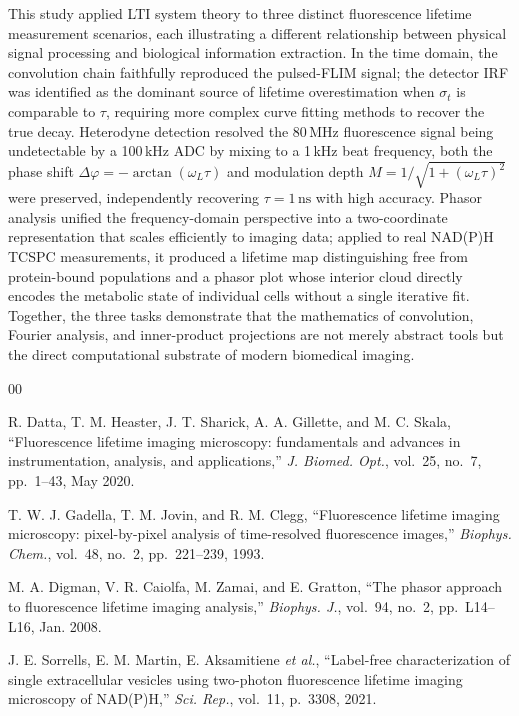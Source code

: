 \documentclass[conference]{IEEEtran}
\begin{document}
This study applied LTI system theory to three distinct fluorescence
lifetime measurement scenarios, each illustrating a different
relationship between physical signal processing and biological
information extraction.
In the time domain, the convolution chain faithfully reproduced the
pulsed-FLIM signal; the detector IRF was identified as the dominant
source of lifetime overestimation when $\sigma_t$ is comparable to
$\tau$, requiring more complex curve fitting methods to recover the true decay.
Heterodyne detection resolved the 80\,MHz
fluorescence signal being undetectable by a 100\,kHz ADC by mixing
to a 1\,kHz beat frequency, both the phase shift
$\Delta\varphi = -\arctan(\omega_L\tau)$ and modulation depth
$M = 1/\sqrt{1+(\omega_L\tau)^2}$ were preserved, independently
recovering $\tau = 1\,\text{ns}$ with high accuracy.
Phasor analysis unified the frequency-domain perspective into a
two-coordinate representation that scales efficiently to imaging
data; applied to real NAD(P)H TCSPC measurements, it produced a
lifetime map distinguishing free from protein-bound populations and a
phasor plot whose interior cloud directly encodes the metabolic state of individual cells
without a single iterative fit.
Together, the three tasks demonstrate that the mathematics of
convolution, Fourier analysis, and inner-product projections are not
merely abstract tools but the direct computational substrate of
modern biomedical imaging.

\begin{thebibliography}{00}

R. Datta, T. M. Heaster, J. T. Sharick, A. A. Gillette, and M. C. Skala,
``Fluorescence lifetime imaging microscopy: fundamentals and advances in
instrumentation, analysis, and applications,''
\textit{J. Biomed. Opt.}, vol.~25, no.~7, pp.~1--43, May 2020.

T. W. J. Gadella, T. M. Jovin, and R. M. Clegg,
``Fluorescence lifetime imaging microscopy: pixel-by-pixel analysis of
time-resolved fluorescence images,''
\textit{Biophys. Chem.}, vol.~48, no.~2, pp.~221--239, 1993.

M. A. Digman, V. R. Caiolfa, M. Zamai, and E. Gratton,
``The phasor approach to fluorescence lifetime imaging analysis,''
\textit{Biophys. J.}, vol.~94, no.~2, pp.~L14--L16, Jan. 2008.

J. E. Sorrells, E. M. Martin, E. Aksamitiene \textit{et al.},
``Label-free characterization of single extracellular vesicles using
two-photon fluorescence lifetime imaging microscopy of {NAD(P)H},''
\textit{Sci. Rep.}, vol.~11, p.~3308, 2021.

\end{thebibliography}

\clearpage
\onecolumn
\appendices
\end{document}
